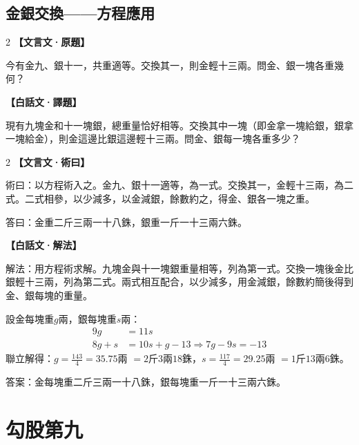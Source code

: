 \documentclass[11pt,a4paper]{article}
\newcommand{\zhc}{}[1]{{\CJKfamily{\CJKrmdefault}#1}}  %
\newcommand{\zhm}[1]{{\CJKfamily{\CJKrmdefault}#1}}  %
\newenvironment{prob bilingual}[1][]{%
  \begin{paracol}{2}%
  \setlength{\columnseprule}{0.4pt}%
}{%
  \end{paracol}%
  \medskip%
}
\begin{document}
\vspace{0.5cm}

\subsection{\zhc{金銀交換——方程應用}}

\begin{paracol}{2}
\switchcolumn[0]
\noindent\textbf{\textcolor{notecolor}{\zhc{【文言文·原題】}}}\par\smallskip
\zhc{
今有金九、銀十一，共重適等。交換其一，則金輕十三兩。問金、銀一塊各重幾何？
}

\switchcolumn[1]
\noindent\textbf{\textcolor{notecolor}{\zhm{【白話文·譯題】}}}\par\smallskip
\zhm{
現有九塊金和十一塊銀，總重量恰好相等。交換其中一塊（即金拿一塊給銀，銀拿一塊給金），則金這邊比銀這邊輕十三兩。問金、銀每一塊各重多少？
}
\end{paracol}

\medskip

\begin{paracol}{2}
\switchcolumn[0]
\noindent\textbf{\textcolor{notecolor}{\zhc{【文言文·術曰】}}}\par\smallskip
\zhc{
術曰：以方程術入之。金九、銀十一適等，為一式。交換其一，金輕十三兩，為二式。二式相參，以少減多，以金減銀，餘數約之，得金、銀各一塊之重。

答曰：金重二斤三兩一十八銖，銀重一斤一十三兩六銖。
}

\switchcolumn[1]
\noindent\textbf{\textcolor{notecolor}{\zhm{【白話文·解法】}}}\par\smallskip
\zhm{
解法：用方程術求解。九塊金與十一塊銀重量相等，列為第一式。交換一塊後金比銀輕十三兩，列為第二式。兩式相互配合，以少減多，用金減銀，餘數約簡後得到金、銀每塊的重量。

設金每塊重$g$兩，銀每塊重$s$兩：
\begin{align*}
9g &= 11s \\
8g + s &= 10s + g - 13 \Rightarrow 7g - 9s = -13
\end{align*}
聯立解得：$g = \frac{143}{4} = 35.75$兩 $= 2$斤$3$兩$18$銖，$s = \frac{117}{4} = 29.25$兩 $= 1$斤$13$兩$6$銖。

答案：金每塊重二斤三兩一十八銖，銀每塊重一斤一十三兩六銖。
}
\end{paracol}

\newpage

\section{\zhc{勾股第九}}
\label{sec:gougu}
\end{document}
